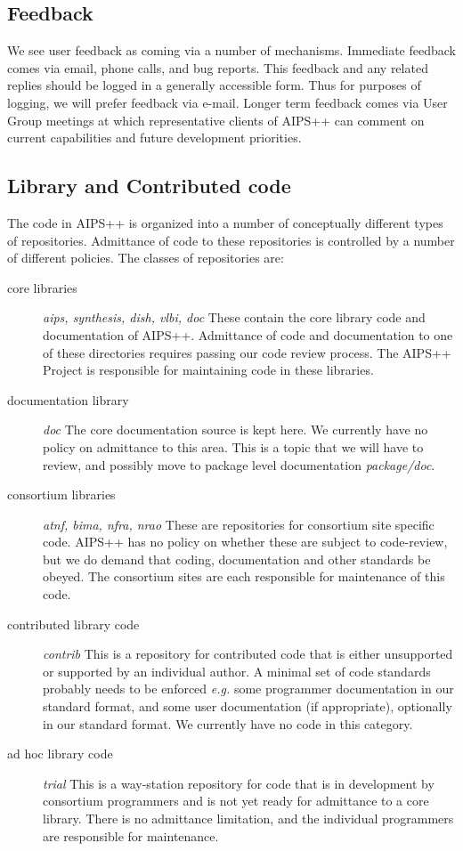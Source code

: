 \subsection{Feedback}

We see user feedback as coming via a number of mechanisms. Immediate
feedback comes via email, phone calls, and bug reports. This feedback
and any related replies should be logged in a generally accessible
form. Thus for purposes of logging, we will prefer feedback via
e-mail. Longer term feedback comes via User Group meetings at which
representative clients of AIPS++ can comment on current capabilities
and future development priorities.

\subsection{Library and Contributed code}

The code in AIPS++ is organized into a number of conceptually
different types of repositories. Admittance of code to these repositories
is controlled by a number of different policies. The classes of
repositories are:

\begin{description}
\item[core libraries] {\em aips, synthesis, dish, vlbi, doc} These contain the core
library code and documentation of AIPS++. Admittance of code and
documentation to one of these directories requires passing our code
review process. The AIPS++ Project is responsible for maintaining code
in these libraries.
\item[documentation library] {\em doc} The core documentation source is kept here.
We currently have no policy on admittance to this area. This is a topic that
we will  have to review, and possibly move to package level documentation
{\em package/doc}.
\item[consortium libraries] {\em atnf, bima, nfra, nrao} These are repositories for
consortium site specific code. AIPS++ has no policy on whether these are subject to
code-review, but we do demand that coding, documentation and other standards
be obeyed. The consortium sites are each responsible for maintenance of this
code.
\item[contributed library code] {\em contrib} This is a repository for contributed
code that is either unsupported or supported by an individual author. A minimal
set of code standards probably needs to be enforced {\em e.g.} some programmer
documentation in our standard format, and some user documentation (if appropriate),
optionally in our standard format. We currently have no code in this category.
\item[ad hoc library code] {\em trial} This is a way-station repository for code that
is in development by consortium programmers and is not yet ready for
admittance to a core library. There is no admittance limitation, and
the individual programmers are responsible for maintenance.
\end{description}

